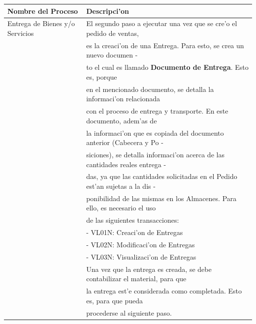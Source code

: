 \begin{table}[H]
\footnotesize
\begin{tabular}{|l|l|}
\hline
\textbf{Nombre del Proceso}  & \textbf{Descripci'on}  \\
\hline
Entrega de Bienes y/o Servicios            & El segundo paso a ejecutar una vez que se cre'o el pedido de ventas,\\
                                                            & es la creaci'on de una  Entrega. Para esto, se crea un nuevo documen -\\
                                                            & to el cual es llamado \textbf{Documento de Entrega}. Esto es, porque\\
                                                            & en el mencionado documento, se detalla la informaci'on relacionada\\
                                                            & con el proceso de entrega y transporte. En este documento, adem'as de\\
                                                            &  la informaci'on que es copiada del documento anterior (Cabecera y Po -\\
                                                            & siciones), se detalla informaci'on acerca de las cantidades reales entrega -\\
                                                            & das, ya que las cantidades solicitadas en el Pedido est'an sujetas a la dis -\\
                                                            & ponibilidad de las mismas en los Almacenes. Para ello, es necesario el uso\\
                                                            & de las siguientes transacciones:\\
															  & - VL01N: Creaci'on de Entregas\\
															  & - VL02N: Modificaci'on de Entregas\\
															  & - VL03N: Visualizaci'on de Entregas\\
															  & Una vez que la entrega es creada, se debe contabilizar el material, para que\\
															  & la entrega est'e considerada como completada. Esto es, para que pueda\\ 
															  & procederse al siguiente paso.\\
\hline

\end{tabular}
\end{table}
